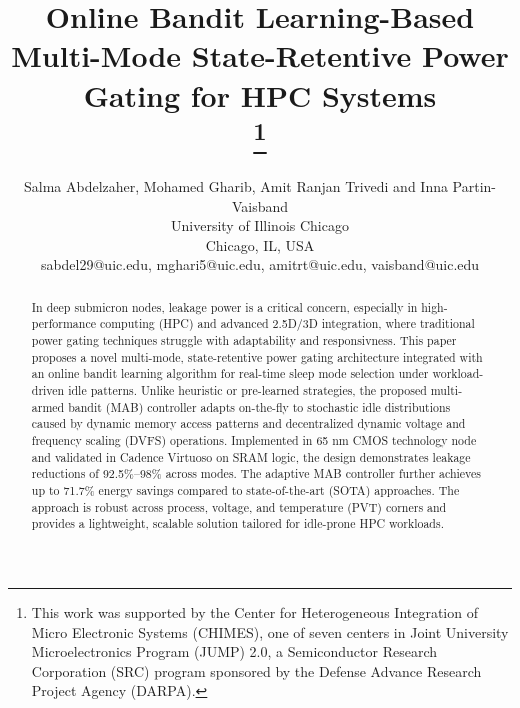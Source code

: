 \documentclass[conference]{IEEEtran}
\begin{document}
\title{Online Bandit Learning-Based Multi-Mode State-Retentive Power Gating for HPC Systems\\
\thanks{This work was supported by the Center for Heterogeneous Integration of Micro Electronic Systems (CHIMES), one of seven centers in Joint University Microelectronics Program (JUMP) 2.0, a Semiconductor Research Corporation (SRC) program sponsored by the Defense Advance Research Project Agency (DARPA).}
}

\author{
\begin{minipage}[t]{\linewidth}
    \centering
    Salma Abdelzaher, Mohamed Gharib, Amit Ranjan Trivedi and Inna Partin-Vaisband\\
    University of Illinois Chicago\\
    Chicago, IL, USA \\
    sabdel29@uic.edu, mghari5@uic.edu, amitrt@uic.edu, vaisband@uic.edu
\end{minipage}
\hfill
}


\maketitle

\begin{abstract}
In deep submicron nodes, leakage power is a critical concern, especially in high-performance computing (HPC) and advanced 2.5D/3D integration, where traditional power gating techniques struggle with adaptability and responsivness. This paper proposes a novel multi-mode, state-retentive power gating architecture integrated with an online bandit learning algorithm for real-time sleep mode selection under workload-driven idle patterns. Unlike heuristic or pre-learned strategies, the proposed multi-armed bandit (MAB) controller adapts on-the-fly to stochastic idle distributions caused by dynamic memory access patterns and decentralized dynamic voltage and frequency scaling (DVFS) operations. Implemented in 65 nm CMOS technology node and validated in Cadence Virtuoso on SRAM logic, the design demonstrates leakage reductions of 92.5\%–98\% across modes. The adaptive MAB controller further achieves up to 71.7\% energy savings compared to state-of-the-art (SOTA) approaches. The approach is robust across process, voltage, and temperature (PVT) corners and provides a lightweight, scalable solution tailored for idle-prone HPC workloads.


\end{abstract}
\end{document}
